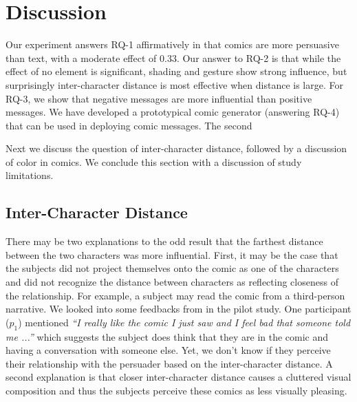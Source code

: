 \section{Discussion}
\label{sec:Discussion}
Our experiment answers RQ-1 affirmatively in that comics are more persuasive than text, with a moderate effect of 0.33. Our answer to RQ-2 is that while the effect of no element is significant, shading and gesture show strong influence, but surprisingly inter-character distance is most effective when distance is large. For RQ-3, we show that negative messages are more influential than positive messages. We have developed a prototypical comic generator (answering RQ-4) that can be used in deploying comic messages. The second

Next we discuss the question of inter-character distance, followed by a discussion of color in comics. We conclude this section with a discussion of study limitations.

%

%
\subsection{Inter-Character Distance}
\label{sub:Inter-Character Distance}
There may be two explanations to the odd result that the farthest distance between the two characters was more influential.
First, it may be the case that the subjects did not project themselves onto the comic as one of the characters and did not recognize the distance between characters as reflecting closeness of the relationship. For example, a subject may read the comic from a third-person narrative. We looked into some feedbacks from in the pilot study. One participant ($p_1$) mentioned \textit{``I really like the comic I just saw and I feel bad that someone told me ...''} which suggests the subject does think that they are in the comic and having a conversation with someone else. Yet, we don't know if they perceive their relationship with the persuader based on the inter-character distance. A second explanation is that closer inter-character distance causes a cluttered visual composition and thus the subjects perceive these comics as less visually pleasing.

